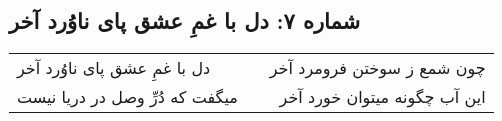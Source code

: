 \begin{center}
\section*{شماره ۷: دل با غمِ عشق پای ناوُرد آخر}
\label{sec:007}
\begin{longtable}{l p{0.5cm} r}
دل با غمِ عشق پای ناوُرد آخر
&&
چون شمع ز سوختن فرومرد آخر
\\
میگفت که دُرِّ وصل در دریا نیست
&&
این آب چگونه میتوان خورد آخر
\\
\end{longtable}
\end{center}
